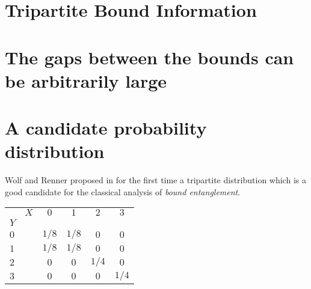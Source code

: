 \section{Tripartite Bound Information}
\section{The gaps between the bounds can be arbitrarily large}
\section{A candidate probability distribution}
    Wolf and Renner proposed in \cite{RW03} for the first time a tripartite distribution which is a good candidate for the classical analysis of \emph{bound entanglement}. 
	\begin{table}
	\begin{center}
		\begin{tabular}{|l r||c|c|c|c|}
		    \hline 
		    		 &	$X$ & $0$ & $1$ & $2$ & $3$ \\ 
		    $Y$ &		  &		&			&			&		\\
		    \hline 
		    \hline
		    $0$ &		   & $1/8$ & $1/8$ & $0$ & $0$ \\ 
		    \hline 
		    $1$ &		   & $1/8$ & $1/8$ & $0$ & $0$ \\ 
		    \hline 
		    $2$ &		   & $0$ & $0$ & $1/4$ & $0$ \\ 
		    \hline 
		    $3$ &		   & $0$ & $0$ & $0$ & $1/4$ \\ 
		    \hline 
		  \end{tabular} 
	\end{center}
		

		

\end{table}
